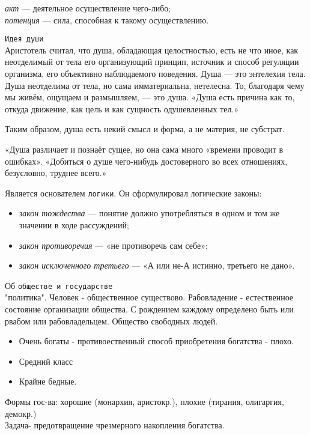 \documentclass[12pt]{article}
\begin{document}
\textit{акт} — деятельное осуществление чего-либо;\\
\textit{потенция} — сила, способная к такому осуществлению.

\texttt{Идея души}\\
Аристотель считал, что душа, обладающая целостностью, есть не что иное, как неотделимый от тела его организующий принцип,
источник и способ регуляции организма, его объективно наблюдаемого поведения.
Душа — это энтелехия тела. Душа неотделима от тела, но сама имматериальна, нетелесна.
То, благодаря чему мы живём, ощущаем и размышляем, — это душа.
«Душа есть причина как то, откуда движение, как цель и как сущность одушевленных тел.»

Таким образом, душа есть некий смысл и форма, а не материя, не субстрат.

«Душа различает и познаёт сущее, но она сама много «времени проводит в ошибках». «Добиться о душе чего-нибудь достоверного во всех отношениях, безусловно, труднее всего.»

Является основателем \texttt{логики}. Он сформулировал логические законы:
\begin{itemize}
\item \textit{закон тождества} — понятие должно употребляться в одном и том же значении в ходе рассуждений;
\item \textit{закон противоречия} — «не противоречь сам себе»;
\item \textit{закон исключенного третьего} — «А или не-А истинно, третьего не дано».
\end{itemize}

Об \texttt{обществе и государстве}\\
"политика". Человек - общественное существово.
Рабовладение - естественное состояние организации общества.
С рождением каждому определено быть или рвабом или рабовладельцем.
Общество свободных людей.
\begin{itemize}
\item Очень богаты - противоественный способ приобретения богатства - плохо. 
\item Средний класс 
\item Крайне бедные. 
\end{itemize}
Формы гос-ва: хорошие (монархия, аристокр.), плохие (тирания, олигаргия, демокр.)\\
Задача- предотвращение чрезмерного накопления богатства.


\newpage
\end{document}

